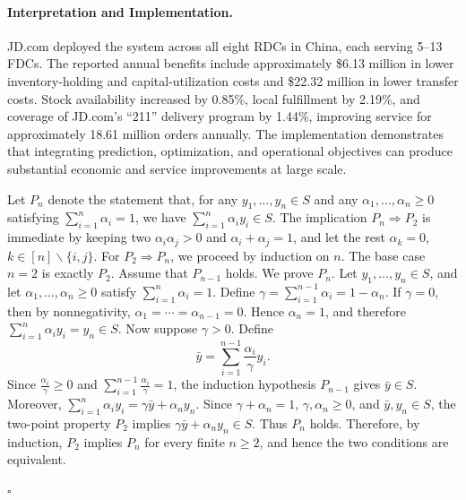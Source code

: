 \documentclass[12pt,a4paper]{article}
\begin{document}
\begin{problem}
\paragraph{Interpretation and Implementation.}
JD.com deployed the system across all eight RDCs in China, each serving 5--13 FDCs. The reported annual benefits include approximately \$6.13 million in lower inventory-holding and capital-utilization costs and \$22.32 million in lower transfer costs. Stock availability increased by 0.85\%, local fulfillment by 2.19\%, and coverage of JD.com's ``211'' delivery program by 1.44\%, improving service for approximately 18.61 million orders annually. The implementation demonstrates that integrating prediction, optimization, and operational objectives can produce substantial economic and service improvements at large scale.

\end{problem}

\newpage

\begin{problem}
Let \(P_n\) denote the statement that, for any \(y_1,\ldots,y_n\in S\) and any \(\alpha_1,\ldots,\alpha_n\ge 0\) satisfying \(\sum_{i=1}^n\alpha_i=1\), we have \(\sum_{i=1}^n\alpha_i y_i\in S\).
The implication \(P_n\Rightarrow P_2\) is immediate by keeping two $\alpha_i \alpha_j > 0$ and $\alpha_i+\alpha_j=1$, and let the rest $\alpha_k =0$, $k\in [n]\backslash\{i,j\}$.
For \(P_2\Rightarrow P_n\), we proceed by induction on \(n\). The base case \(n=2\) is exactly \(P_2\).
Assume that \(P_{n-1}\) holds. We prove \(P_n\). Let \(y_1,\ldots,y_n\in S\), and let \(\alpha_1,\ldots,\alpha_n\ge 0\) satisfy \(\sum_{i=1}^n\alpha_i=1\). Define \(\gamma=\sum_{i=1}^{n-1}\alpha_i=1-\alpha_n\).
If \(\gamma=0\), then by nonnegativity, \(\alpha_1=\cdots=\alpha_{n-1}=0\). Hence \(\alpha_n=1\), and therefore \(\sum_{i=1}^n\alpha_i y_i=y_n\in S\).
Now suppose \(\gamma>0\). Define
\[
\bar y=\sum_{i=1}^{n-1}\frac{\alpha_i}{\gamma}y_i.
\]
Since \(\frac{\alpha_i}{\gamma}\ge 0\) and \(\sum_{i=1}^{n-1}\frac{\alpha_i}{\gamma}=1\), the induction hypothesis \(P_{n-1}\) gives \(\bar y\in S\).
Moreover, \(\sum_{i=1}^n\alpha_i y_i=\gamma\bar y+\alpha_n y_n\). Since \(\gamma+\alpha_n=1\), \(\gamma,\alpha_n\ge 0\), and \(\bar y,y_n\in S\), the two-point property \(P_2\) implies \(\gamma\bar y+\alpha_n y_n\in S\). Thus \(P_n\) holds.
Therefore, by induction, \(P_2\) implies \(P_n\) for every finite \(n\ge 2\), and hence the two conditions are equivalent.

$\square$
\end{problem}
\end{document}
